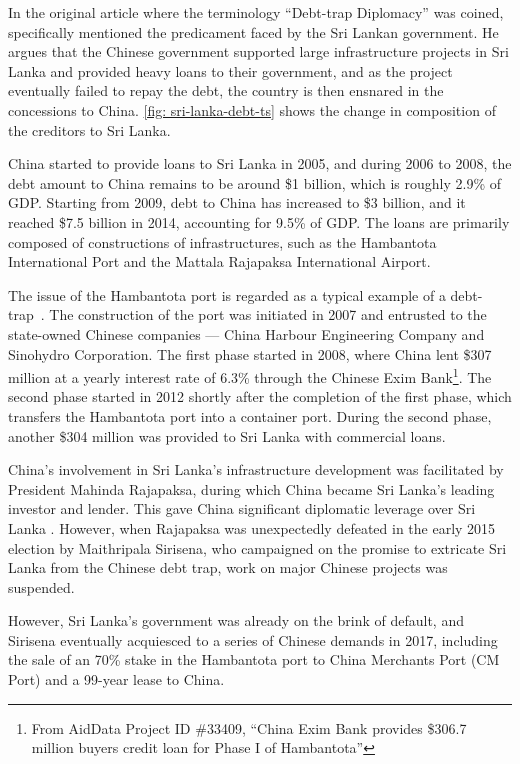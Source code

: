 In the original article where the terminology ``Debt-trap Diplomacy'' was coined, \citet{Chellaney_2017} specifically mentioned the predicament faced by the Sri Lankan government. He argues that the Chinese government supported large infrastructure projects in Sri Lanka and provided heavy loans to their government, and as the project eventually failed to repay the debt, the country is then ensnared in the concessions to China. \autoref{fig: sri-lanka-debt-ts} shows the change in composition of the creditors to Sri Lanka.

China started to provide loans to Sri Lanka in 2005, and during 2006 to 2008, the debt amount to China remains to be around \$1 billion, which is roughly 2.9\% of GDP. Starting from 2009, debt to China has increased to \$3 billion, and it reached \$7.5 billion in 2014, accounting for 9.5\% of GDP. The loans are primarily composed of constructions of infrastructures, such as the Hambantota International Port and the Mattala Rajapaksa International Airport.

The issue of the Hambantota port is regarded as a typical example of a debt-trap~\citep*{Moramudali_2020}.
The construction of the port was initiated in 2007 and entrusted to the state-owned Chinese companies --- China Harbour Engineering Company and Sinohydro Corporation.
The first phase started in 2008, where China lent \$307 million at a yearly interest rate of 6.3\% through the Chinese Exim Bank\footnote{
    From AidData Project ID \#33409, ``China Exim Bank provides \$306.7 million buyers credit loan for Phase I of Hambantota''}.
The second phase started in 2012 shortly after the completion of the first phase, which transfers the Hambantota port into a container port\cite{}. During the second phase, another \$304 million was provided to Sri Lanka with commercial loans.


China's involvement in Sri Lanka's infrastructure development was facilitated by President Mahinda Rajapaksa, during which China became Sri Lanka's leading investor and lender. This gave China significant diplomatic leverage over Sri Lanka \citep*{Chellaney_2017}.
However, when Rajapaksa was unexpectedly defeated in the early 2015 election by Maithripala Sirisena, who campaigned on the promise to extricate Sri Lanka from the Chinese debt trap, work on major Chinese projects was suspended.

However, Sri Lanka's government was already on the brink of default, and Sirisena eventually acquiesced to a series of Chinese demands in 2017\footnotemark{}, including the sale of an 70\% stake in the Hambantota port to China Merchants Port (CM Port) and a 99-year lease to China.

